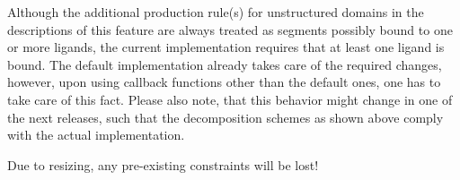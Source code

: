 
\begin{DoxyRefList}
\item[\label{bug__bug000002}%
\hypertarget{bug__bug000002}{}%
Module \hyperlink{group__domains__up}{domains\+\_\+up} ]Although the additional production rule(s) for unstructured domains in the descriptions of this feature are always treated as \textquotesingle{}segments possibly bound to one or more ligands\textquotesingle{}, the current implementation requires that at least one ligand is bound. The default implementation already takes care of the required changes, however, upon using callback functions other than the default ones, one has to take care of this fact. Please also note, that this behavior might change in one of the next releases, such that the decomposition schemes as shown above comply with the actual implementation. 
\item[\label{bug__bug000001}%
\hypertarget{bug__bug000001}{}%
Global \hyperlink{group__subopt__zuker_gababde9d210eb433854f1e71da7815fbb}{vrna\+\_\+subopt\+\_\+zuker} (vrna\+\_\+fold\+\_\+compound\+\_\+t $\ast$vc)]Due to resizing, any pre-\/existing constraints will be lost!
\end{DoxyRefList}